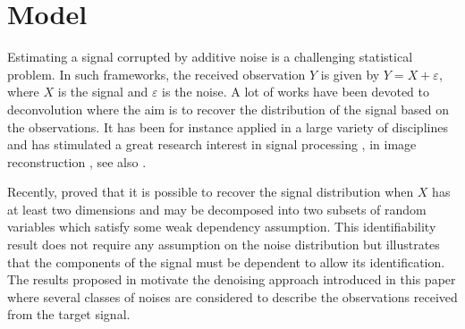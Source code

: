 \documentclass{article}
\begin{document}
\section{Model}
\label{sec:model}

Estimating a signal corrupted by additive noise  is a challenging statistical problem. In such frameworks, the received observation $Y$ is given by $Y = X + \varepsilon$,  where $X$ is the signal and $\varepsilon$ is the noise. A lot of works have been devoted to deconvolution where the aim is to recover the distribution of the signal based on the observations. It has been for instance applied in a large variety of disciplines and has stimulated a great research interest in signal processing \cite{moulines1997maximum,attias1998blind}, in image reconstruction \cite{kundur1996blind,campisi2017blind}, see also  \cite{meister:2009}.


Recently, \cite{gassiat:lecorff:lehericy:2021} proved that it is possible to recover the signal distribution when $X$ has at least two dimensions and may be decomposed into two subsets of random variables which satisfy some weak dependency assumption. This identifiability result does not require any assumption on the noise distribution but illustrates that the components of the signal must be dependent to allow its identification. The results proposed in \cite{gassiat:lecorff:lehericy:2021} motivate the denoising approach introduced in this paper where several classes of noises are considered to describe the observations received from the target signal.  %
\end{document}
